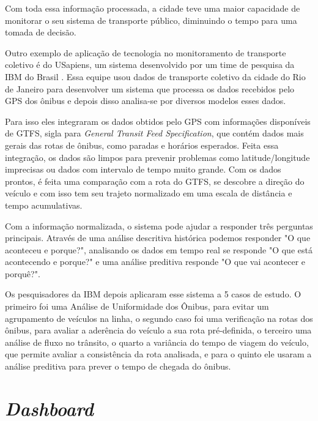 \par Com toda essa informação processada, a cidade teve uma maior capacidade de monitorar o seu sistema de transporte público, diminuindo o tempo para uma tomada de decisão.

\par Outro exemplo de aplicação de tecnologia no monitoramento de transporte coletivo é do USapiens, um sistema desenvolvido por um time de pesquisa da IBM do Brasil \cite{Vieira2015}. Essa equipe usou dados de transporte coletivo da cidade do Rio de Janeiro para desenvolver um sistema que processa os dados recebidos pelo GPS dos ônibus e depois disso analisa-se por diversos modelos esses dados.

\par Para isso eles integraram os dados obtidos pelo GPS com informações disponíveis de GTFS, sigla para \textit{General Transit Feed Specification}, que contém dados mais gerais das rotas de ônibus, como paradas e horários esperados. Feita essa integração, os dados são limpos para prevenir problemas como latitude/longitude imprecisas ou dados com intervalo de tempo muito grande. Com os dados prontos, é feita uma comparação com a rota do GTFS, se descobre a direção do veículo e com isso tem seu trajeto normalizado em uma escala de distância e tempo acumulativas.

\par Com a informação normalizada, o sistema pode ajudar a responder três perguntas principais. Através de uma análise descritiva histórica podemos responder "O que aconteceu e porque?", analisando os dados em tempo real se responde "O que está acontecendo e porque?" e uma análise preditiva responde "O que vai acontecer e porquê?".

\par Os pesquisadores da IBM depois aplicaram esse sistema a 5 casos de estudo. O primeiro foi uma Análise de Uniformidade dos Ônibus, para evitar um agrupamento de veículos na linha, o segundo caso foi uma verificação na rotas dos ônibus, para avaliar a aderência do veículo a sua rota pré-definida, o terceiro uma análise de fluxo no trânsito, o quarto a variância do tempo de viagem do veículo, que permite avaliar a consistência da rota analisada, e para o quinto ele usaram a análise preditiva para prever o tempo de chegada do ônibus.

\section{\textit{Dashboard}}

